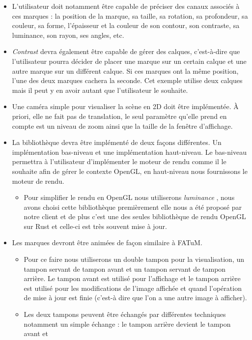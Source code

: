 \documentclass[12pt]{article}
\begin{document}
\begin{itemize}
\item L'utilisateur doit notamment être capable de préciser des \gls{canaux} associés à
ces marques : la position de la marque, sa taille, sa rotation, sa profondeur, sa couleur, sa forme,
l'épaisseur et la couleur de son contour, son contraste, sa luminance, son rayon, ses angles, etc.
\item \textit{Contrast} devra également être capable de gérer des calques, c'est-à-dire que l'utilisateur pourra
décider de placer une marque sur un certain calque et une autre marque sur un différent calque. Si ces
marques ont la même position, l'une des deux marques cachera la seconde. Cet exemple utilise deux calques
mais il peut y en avoir autant que l'utilisateur le souhaite.
\item Une caméra simple pour visualiser la scène en 2D doit être implémentée. À priori, elle ne fait pas
de translation, le seul paramètre qu'elle prend en compte est un niveau de zoom ainsi que la taille
de la fenêtre d'affichage.
\item La bibliothèque devra être implémenté de deux façons différentes. Un implémentation bas-niveau et une implémentation haut-niveau. 
		Le bas-niveau permettra à l'utilisateur d'implémenter le moteur de rendu comme il le souhaite afin de gérer le contexte OpenGL, en haut-niveau nous
		fournissons le moteur de rendu.
		\begin{itemize}
			\item Pour simplifier le rendu en OpenGL nous utiliserons \textit{luminance} \cite{luminance}, nous avons choisi cette bibliothèque
			premièrement elle nous a été proposé par notre client et de plus c'est une des seules bibliothèque de rendu OpenGL sur Rust et celle-ci est
			très souvent mise à jour.
		\end{itemize}
\item Les marques devront être animées de façon similaire à FATuM.
	\begin{itemize}
	\item Pour ce faire nous utiliserons un double tampon pour la visualisation, un tampon servant de tampon avant et un tampon servant de tampon arrière.
	Le tampon avant est utilisé pour l'affichage et le tampon arrière est utilisé pour les modifications de l'image affichée et quand l'opération de mise
	à jour est finie (c'est-à dire que l'on a une autre image à afficher).
	\item Les deux tampons peuvent être échangés par différentes techniques notamment un simple échange : le tampon arrière devient le tampon avant et

\end{itemize}
\end{itemize}
\end{document}
